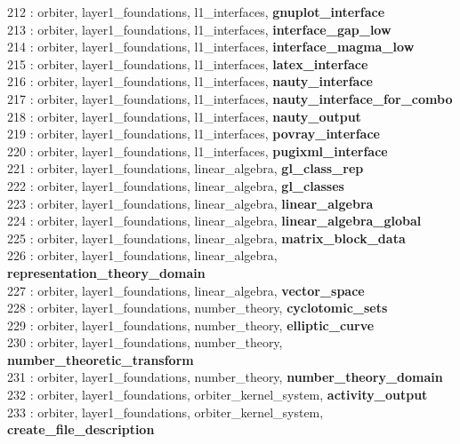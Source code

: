 212 : orbiter, layer1\_foundations, l1\_interfaces, {\bf gnuplot\_interface}\\
213 : orbiter, layer1\_foundations, l1\_interfaces, {\bf interface\_gap\_low}\\
214 : orbiter, layer1\_foundations, l1\_interfaces, {\bf interface\_magma\_low}\\
215 : orbiter, layer1\_foundations, l1\_interfaces, {\bf latex\_interface}\\
216 : orbiter, layer1\_foundations, l1\_interfaces, {\bf nauty\_interface}\\
217 : orbiter, layer1\_foundations, l1\_interfaces, {\bf nauty\_interface\_for\_combo}\\
218 : orbiter, layer1\_foundations, l1\_interfaces, {\bf nauty\_output}\\
219 : orbiter, layer1\_foundations, l1\_interfaces, {\bf povray\_interface}\\
220 : orbiter, layer1\_foundations, l1\_interfaces, {\bf pugixml\_interface}\\
221 : orbiter, layer1\_foundations, linear\_algebra, {\bf gl\_class\_rep}\\
222 : orbiter, layer1\_foundations, linear\_algebra, {\bf gl\_classes}\\
223 : orbiter, layer1\_foundations, linear\_algebra, {\bf linear\_algebra}\\
224 : orbiter, layer1\_foundations, linear\_algebra, {\bf linear\_algebra\_global}\\
225 : orbiter, layer1\_foundations, linear\_algebra, {\bf matrix\_block\_data}\\
226 : orbiter, layer1\_foundations, linear\_algebra, {\bf representation\_theory\_domain}\\
227 : orbiter, layer1\_foundations, linear\_algebra, {\bf vector\_space}\\
228 : orbiter, layer1\_foundations, number\_theory, {\bf cyclotomic\_sets}\\
229 : orbiter, layer1\_foundations, number\_theory, {\bf elliptic\_curve}\\
230 : orbiter, layer1\_foundations, number\_theory, {\bf number\_theoretic\_transform}\\
231 : orbiter, layer1\_foundations, number\_theory, {\bf number\_theory\_domain}\\
232 : orbiter, layer1\_foundations, orbiter\_kernel\_system, {\bf activity\_output}\\
233 : orbiter, layer1\_foundations, orbiter\_kernel\_system, {\bf create\_file\_description}\\
